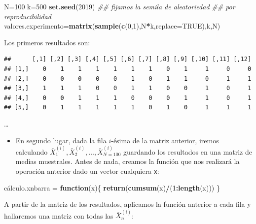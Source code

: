 \documentclass[]{book}
\newenvironment{Shaded}{\begin{snugshade}}{\end{snugshade}}
\newcommand{\CommentTok}[1]{\textcolor[rgb]{0.56,0.35,0.01}{\textit{#1}}}
\newcommand{\ControlFlowTok}[1]{\textcolor[rgb]{0.13,0.29,0.53}{\textbf{#1}}}
\newcommand{\DataTypeTok}[1]{\textcolor[rgb]{0.13,0.29,0.53}{#1}}
\newcommand{\DecValTok}[1]{\textcolor[rgb]{0.00,0.00,0.81}{#1}}
\newcommand{\KeywordTok}[1]{\textcolor[rgb]{0.13,0.29,0.53}{\textbf{#1}}}
\newcommand{\NormalTok}[1]{#1}
\newcommand{\OperatorTok}[1]{\textcolor[rgb]{0.81,0.36,0.00}{\textbf{#1}}}
\newcommand{\OtherTok}[1]{\textcolor[rgb]{0.56,0.35,0.01}{#1}}
\newcommand{\StringTok}[1]{\textcolor[rgb]{0.31,0.60,0.02}{#1}}
\providecommand{\tightlist}{%
  \setlength{\itemsep}{0pt}\setlength{\parskip}{0pt}}
\begin{document}
\begin{Shaded}
\begin{Highlighting}[]
\NormalTok{N=}\DecValTok{100}
\NormalTok{k=}\DecValTok{500}
\KeywordTok{set.seed}\NormalTok{(}\DecValTok{2019}\NormalTok{) }
\CommentTok{## fijamos la semila de aleatoriedad}
\CommentTok{## por reproducibilidad}
\NormalTok{valores.experimento=}\KeywordTok{matrix}\NormalTok{(}\KeywordTok{sample}\NormalTok{(}\KeywordTok{c}\NormalTok{(}\DecValTok{0}\NormalTok{,}\DecValTok{1}\NormalTok{),N}\OperatorTok{*}\NormalTok{k,}\DataTypeTok{replace=}\OtherTok{TRUE}\NormalTok{),k,N)}
\end{Highlighting}
\end{Shaded}

Los primeros resultados son:

\begin{verbatim}
##      [,1] [,2] [,3] [,4] [,5] [,6] [,7] [,8] [,9] [,10] [,11] [,12]
## [1,]    0    1    1    1    1    1    1    0    1     1     0     0
## [2,]    0    0    0    0    0    1    0    1    1     0     1     1
## [3,]    1    1    1    0    0    1    1    0    0     1     0     1
## [4,]    0    0    1    1    1    0    0    0    1     1     0     1
## [5,]    0    1    1    1    1    1    0    1    0     1     1     1
\end{verbatim}

\ldots{}

\begin{itemize}
\tightlist
\item
  En segundo lugar, dada la fila \(i\)-ésima de la matriz anterior, iremos calculando \(\overline{X}_1^{(i)},\overline{X}_2^{(i)},\ldots,\overline{X}_{N=100}^{(i)}\) guardando los resultados en una matriz de medias muestrales.
  Antes de nada, creamos la función que nos realizará la operación anterior dado un vector cualquiera \texttt{x}:
\end{itemize}

\begin{Shaded}
\begin{Highlighting}[]
\NormalTok{cálculo.xnbarra =}\StringTok{ }\ControlFlowTok{function}\NormalTok{(x)\{}
  \KeywordTok{return}\NormalTok{(}\KeywordTok{cumsum}\NormalTok{(x)}\OperatorTok{/}\NormalTok{(}\DecValTok{1}\OperatorTok{:}\KeywordTok{length}\NormalTok{(x)))}
\NormalTok{\}}
\end{Highlighting}
\end{Shaded}

A partir de la matriz de los resultados, aplicamos la función anterior a cada fila y hallaremos una matriz con todas las \(\overline{X}_n^{(i)}\):
\end{document}
